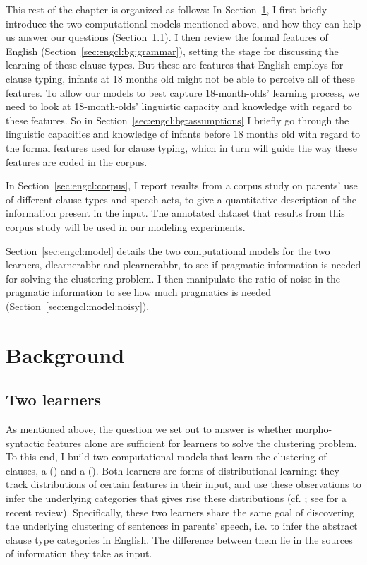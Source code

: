 This rest of the chapter is organized as follows: 
In Section~\ref{sec:engcl:background}, I first briefly introduce the two computational models mentioned above, and how they can help us answer our questions (Section~\ref{sec:engcl:bg:learners}). I then review the formal features of English \diis{} (Section~\ref{sec:engcl:bg:grammar}), setting the stage for discussing the learning of these clause types. But these are features that English employs for clause typing, infants at 18 months old might not be able to perceive all of these features. To allow our models to best capture 18-month-olds' learning process, we need to look at 18-month-olds' linguistic capacity and knowledge with regard to these features. So in Section~\ref{sec:engcl:bg:assumptions} I briefly go through the linguistic capacities and knowledge of infants before 18 months old with regard to the formal features used for clause typing, which in turn will guide the way these features are coded in the corpus. 

In Section~\ref{sec:engcl:corpus}, I report results from a corpus study on parents' use of different clause types and speech acts, to give a quantitative description of the information present in the input. The annotated dataset that results from this corpus study will be used in our modeling experiments.

Section~\ref{sec:engcl:model} details the two computational models for the two learners, \gls{dlearnerabbr} and \gls{plearnerabbr}, to see if pragmatic information is needed for solving the clustering problem. I then manipulate the ratio of noise in the pragmatic information to see how much pragmatics is needed (Section~\ref{sec:engcl:model:noisy}). 

\section{Background}
\label{sec:engcl:background}

\subsection{Two learners} 
\label{sec:engcl:bg:learners}
As mentioned above, the question we set out to answer is whether morpho-syntactic features alone are sufficient for learners to solve the clustering problem. To this end, I build two computational models that learn the clustering of clauses, a \text{\distlearner{}} (\dlearnerabbr{}) and a \text{\praglearner{}} (\plearnerabbr{}). Both learners are forms of distributional learning: they track distributions of certain features in their input, and use these observations to infer the underlying categories that gives rise these distributions
(cf. \cite{feldman2013,gagliardi2017modeling,perkins2022vmodel,perkins2019,nguyenwilson2021}; see \cite{pearl2020review} for a recent review). Specifically, these two learners share the same goal of discovering the underlying clustering of sentences in parents' speech, i.e. to infer the abstract clause type categories in English. The difference between them lie in the sources of information they take as input. 

